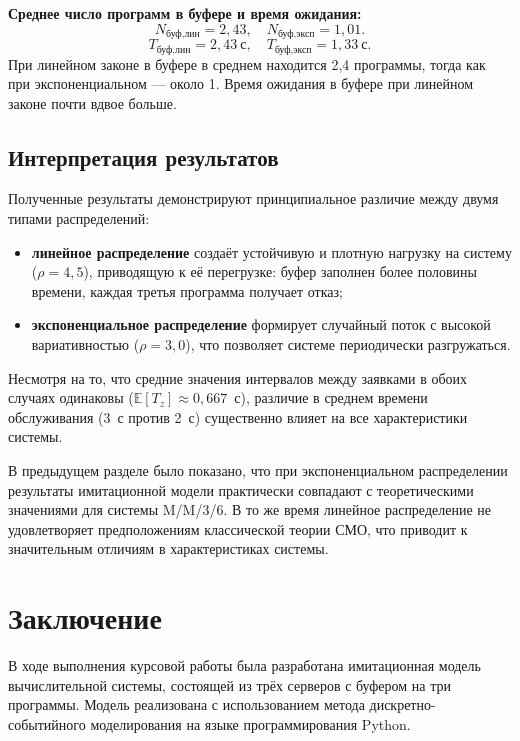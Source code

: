 \documentclass[14pt,a4paper]{extarticle}
\begin{document}
\textbf{Среднее число программ в буфере и время ожидания:}
\[
  N_{\text{буф,лин}} = 2{,}43, \quad N_{\text{буф,эксп}} = 1{,}01.
\]
\[
  T_{\text{буф,лин}} = 2{,}43\ \text{с}, \quad T_{\text{буф,эксп}} = 1{,}33\ \text{с}.
\]
При линейном законе в буфере в среднем находится 2{,}4 программы, тогда как
при экспоненциальном --- около 1. Время ожидания в буфере при линейном законе
почти вдвое больше.

\subsection{Интерпретация результатов}

Полученные результаты демонстрируют принципиальное различие между двумя типами
распределений:
\begin{itemize}
  \item \textbf{линейное распределение} создаёт устойчивую и плотную нагрузку
        на систему ($\rho = 4{,}5$), приводящую к её перегрузке: буфер заполнен
        более половины времени, каждая третья программа получает отказ;
  \item \textbf{экспоненциальное распределение} формирует случайный поток с
        высокой вариативностью ($\rho = 3{,}0$), что позволяет системе
        периодически разгружаться.
\end{itemize}

Несмотря на то, что средние значения интервалов между заявками в обоих случаях
одинаковы ($\mathbb{E}[T_z] \approx 0{,}667$~с), различие в среднем времени
обслуживания (3~с против 2~с) существенно влияет на все характеристики системы.

В предыдущем разделе было показано, что при экспоненциальном распределении
результаты имитационной модели практически совпадают с теоретическими значениями
для системы M/M/3/6. В то же время линейное распределение не удовлетворяет
предположениям классической теории СМО, что приводит к значительным отличиям
в характеристиках системы.

\newpage
\section*{Заключение}

В ходе выполнения курсовой работы была разработана имитационная модель
вычислительной системы, состоящей из трёх серверов с буфером на три программы.
Модель реализована с использованием метода дискретно-событийного моделирования
на языке программирования Python.
\end{document}
